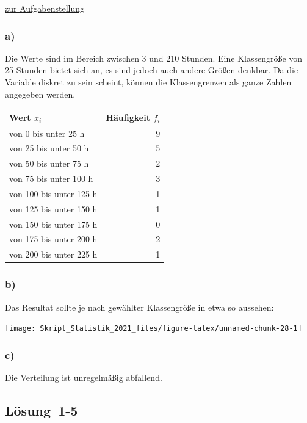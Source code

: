 \documentclass[
  11pt,
  ngerman,
  a4paper,
]{report}
\begin{document}
\protect\hyperlink{aufgabe-1-4}{zur Aufgabenstellung}

\hypertarget{a-1}{%
\subsubsection{a)}\label{a-1}}

Die Werte sind im Bereich zwischen 3 und 210 Stunden. Eine Klassengröße von 25 Stunden bietet sich an, es sind jedoch auch andere Größen denkbar. Da die Variable diskret zu sein scheint, können die Klassengrenzen als ganze Zahlen angegeben werden.

\begin{table}[H]
\centering
\begin{tabular}{lr}
\toprule
Wert $x_i$ & Häufigkeit $f_i$\\
\midrule
von 0 bis unter 25 h & 9\\
von 25 bis unter 50 h & 5\\
von 50 bis unter 75 h & 2\\
von 75 bis unter 100 h & 3\\
von 100 bis unter 125 h & 1\\
von 125 bis unter 150 h & 1\\
von 150 bis unter 175 h & 0\\
von 175 bis unter 200 h & 2\\
von 200 bis unter 225 h & 1\\
\bottomrule
\end{tabular}
\end{table}

\hypertarget{b-1}{%
\subsubsection{b)}\label{b-1}}

Das Resultat sollte je nach gewählter Klassengröße in etwa so aussehen:

\begin{center}\texttt{[image: Skript\_Statistik\_2021\_files/figure-latex/unnamed-chunk-28-1]} \end{center}

\hypertarget{c-1}{%
\subsubsection{c)}\label{c-1}}

Die Verteilung ist unregelmäßig abfallend.

\hypertarget{loesung-1-5}{%
\subsection{Lösung~1-5}\label{loesung-1-5}}
\end{document}
